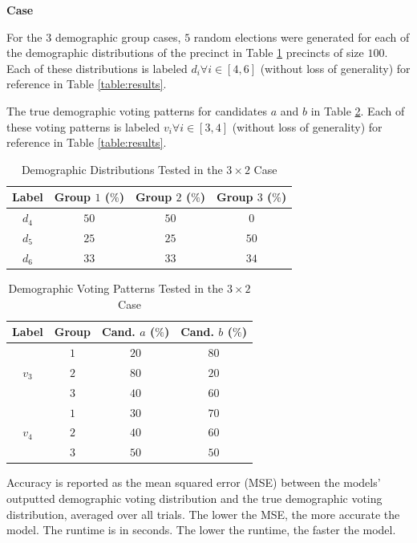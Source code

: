  \textbf{Case}

For the $3$ demographic group cases, $5$ random elections were generated for each of the demographic distributions of the precinct in Table \ref{table:demo_dist_3} precincts of size $100$. Each of these distributions is labeled $d_i \forall i \in [4, 6]$ (without loss of generality) for reference in Table \ref{table:results}.

The true demographic voting patterns for candidates $a$ and $b$ in Table \ref{table:voting_3}. Each of these voting patterns is labeled $v_i \forall i \in [3, 4]$ (without loss of generality) for reference in Table \ref{table:results}.

\begin{table}[ht]
 \centering
 \caption{Demographic Distributions Tested in the $3 \times 2$ Case}
 \label{table:demo_dist_3}
 \begin{tabular}{|c|c|c|c|}
   \hline
   Label & Group $1$ ($\%$) & Group $2$ ($\%$) & Group $3$ ($\%$) \\
   \hline
   $d_4$ & $50$ & $50$ & $0$ \\
   $d_5$ & $25$ & $25$ & $50$ \\
   $d_6$ & $33$ & $33$ & $34$ \\
  \hline
 \end{tabular}
\end{table}

\begin{table}[ht]
 \centering
 \caption{Demographic Voting Patterns Tested in the $3 \times 2$ Case}
 \label{table:voting_3}
 \begin{tabular}{|c|c|c|c|}
   \hline
   Label & Group & Cand. $a$ ($\%$) & Cand. $b$ ($\%$) \\
   \hline
   \multirow{3}{*}{$v_3$} & $1$ & $20$ & $80$ \\
   & $2$ & $80$ & $20$ \\
   & $3$ & $40$ & $60$ \\
   \hline
   \multirow{3}{*}{$v_4$} & $1$ & $30$ & $70$ \\
   & $2$ & $40$ & $60$ \\
   & $3$ & $50$ & $50$ \\
  \hline
 \end{tabular}
\end{table}


Accuracy is reported as the mean squared error (MSE) between the models' outputted demographic voting distribution and the true demographic voting distribution, averaged over all trials. The lower the MSE, the more accurate the model. The runtime is in seconds. The lower the runtime, the faster the model.

